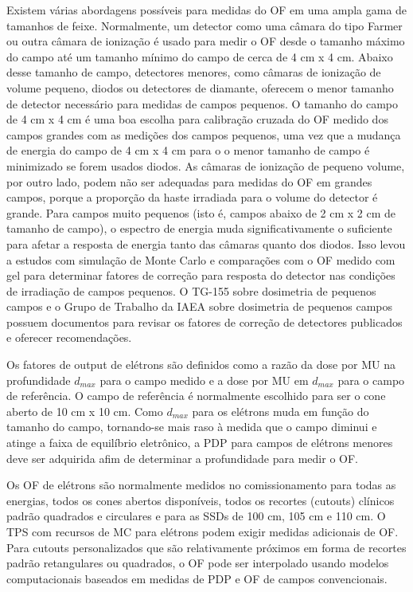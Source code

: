 \documentclass[11pt,a4paper]{article}
\begin{document}
	Existem várias abordagens possíveis para medidas do OF em uma ampla gama de tamanhos de feixe. Normalmente, um detector como uma câmara do tipo Farmer ou outra câmara de ionização é usado para medir o OF desde o tamanho máximo do campo até um tamanho mínimo do campo de cerca de 4 cm x 4 cm. Abaixo desse tamanho de campo, detectores menores, como câmaras de ionização de volume pequeno, diodos ou detectores de diamante, oferecem o menor tamanho de detector necessário para medidas de campos pequenos. O tamanho do campo de 4 cm x 4 cm é uma boa escolha para calibração cruzada do OF medido dos campos grandes com as medições dos campos pequenos, uma vez que a mudança de energia do campo de 4 cm x 4 cm para o o menor tamanho de campo é minimizado se forem usados diodos. As câmaras de ionização de pequeno volume, por outro lado, podem não ser adequadas para medidas do OF em grandes campos, porque a proporção da haste irradiada para o volume do detector é grande. Para campos muito pequenos (isto é, campos abaixo de 2 cm x 2 cm de tamanho de campo), o espectro de energia muda significativamente o suficiente para afetar a resposta de energia tanto das câmaras quanto dos diodos. Isso levou a estudos com simulação de Monte Carlo e comparações com o OF medido com gel para determinar fatores de correção para resposta do detector nas condições de irradiação de campos pequenos. O TG-155 sobre dosimetria de pequenos campos e o Grupo de Trabalho da IAEA sobre dosimetria de pequenos campos possuem documentos para revisar os fatores de correção de detectores publicados e oferecer recomendações.

	Os fatores de output de elétrons são definidos como a razão da dose por MU na profundidade $d_{max}$ para o campo medido e a dose por MU em $d_{max}$ para o campo de referência. O campo de referência é normalmente escolhido para ser o cone aberto de 10 cm x 10 cm. Como $d_{max}$ para  os elétrons muda em função do tamanho do campo, tornando-se mais raso à medida que o campo diminui e atinge a faixa de equilíbrio eletrônico, a PDP para campos de elétrons menores deve ser adquirida afim de determinar a profundidade para medir o OF.

	Os OF de elétrons são normalmente medidos no comissionamento para todas as energias, todos os cones abertos disponíveis, todos os recortes (cutouts) clínicos padrão quadrados e circulares e para as SSDs de 100 cm, 105 cm e 110 cm. O TPS com recursos de MC para elétrons podem exigir medidas adicionais de OF. Para cutouts personalizados que são relativamente próximos em forma de recortes padrão retangulares ou quadrados, o OF pode ser interpolado usando modelos computacionais baseados em medidas de PDP e OF de campos convencionais. 
\end{document}
